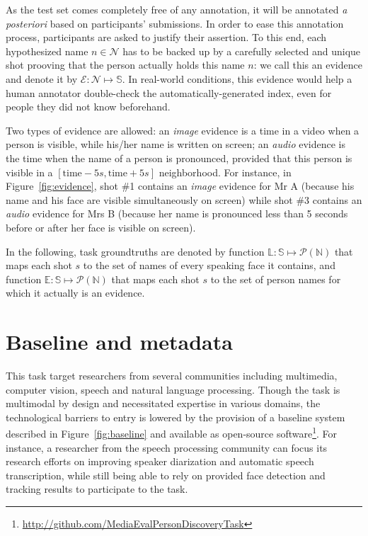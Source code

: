 \documentclass{acm_proc_article-me}
\newcommand\refEvidences{\mathbb{E}}
\newcommand\refLabels{\mathbb{L}}
\newcommand\refNames{\mathbb{N}}
\newcommand\shots{\mathbb{S}}
\newcommand\hypEvidences{\mathcal{E}}
\newcommand\hypNames{\mathcal{N}}
\begin{document}
As the test set comes completely free of any annotation, it will be annotated \emph{a posteriori} based on participants' submissions. 
In order to ease this annotation process, participants are asked to justify their assertion. To this end, each hypothesized name $n \in \hypNames$ has to be backed up by a carefully selected and unique shot prooving that the person actually holds this name $n$: we call this an evidence and denote it by $\hypEvidences : \hypNames \mapsto \shots$. In real-world conditions, this evidence would help a human annotator double-check the automatically-generated index, even for people they did not know beforehand.

Two types of evidence are allowed: an \emph{image} evidence is a time in a video when a person is visible, while his/her name is written on screen; an \emph{audio} evidence is the time when the name of a person is pronounced, provided that this person is visible in a $[\text{time} - 5s, \text{time} + 5s ]$ neighborhood.
For instance, in Figure~\ref{fig:evidence}, shot \#1 contains an \emph{image} evidence for Mr A (because his name and his face are visible simultaneously on screen) while shot \#3 contains an \emph{audio} evidence for Mrs B (because her name is pronounced less than 5 seconds before or after her face is visible on screen).

In the following, task groundtruths are denoted by function $\refLabels : \shots \mapsto \mathcal{P}(\refNames)$ that maps each shot $s$ to the set of names of every speaking face it contains, and function $\refEvidences : \shots \mapsto \mathcal{P}(\refNames)$ that maps each shot $s$ to the set of person names for which it actually is an evidence.

\vspace{-0.1cm}
\section{Baseline and metadata}

This task target researchers from several communities including multimedia, computer vision, speech and natural language processing. Though the task is multimodal by design and necessitated expertise in various domains, the technological barriers to entry is lowered by the provision of a baseline system described in Figure~\ref{fig:baseline} and available as open-source software\footnote{\url{http://github.com/MediaEvalPersonDiscoveryTask}}.
For instance, a researcher from the speech processing community can focus its research efforts on improving speaker diarization and automatic speech transcription, while still being able to rely on provided face detection and tracking results to participate to the task.
\end{document}
